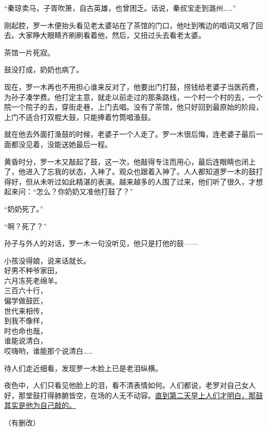 \documentclass[11pt,a4paper]{ctexart}
\begin{document}
\begin{materialtext}
“秦琼卖马，子胥吹箫，自古英雄，也曾困乏。话说，秦叔宝走到潞州……”

刚起腔，罗一木便抬头看见老太婆站在了茶馆的门口，他吐到嘴边的唱词又咽了回去。大家睁大眼睛齐刷刷看着他，然后，又扭过头去看老太婆。

茶馆一片死寂。

鼓没打成，奶奶也病了。

现在，罗一木再也不用担心谁来反对了，他要出门打鼓，捞钱给老婆子当医药费，为孙子凑学费。他打定主意，就走以前走过的那条路线，一个村一个村的去，一个院一个院子的去，穿街走巷，上门去唱。没有了茶馆，他只好回到最原始的阶段，上门不适合打双棍大鼓，只能捧着竹筒唱渔鼓。

就在他去外面打渔鼓的时候，老婆子一个人走了。罗一木很后悔，连老婆子最后一面都没见着，没能送她最后一程。

黄昏时分，罗一木又敲起了鼓，这一次，他敲得专注而用心，最后连眼睛也闭上了，他进入了忘我的状态，入神了。观众也跟着入神了。人人都知道罗一木的鼓打得好，但从未听过如此精湛的表演。越来越多的人围了过来，他们听了很久，才想起来问：“怎么？你奶奶又准他打鼓了？”

“奶奶死了。”

“啊？死了？”

孙子与外人的对话，罗一木一句没听见，他只是打他的鼓——

\begin{center}
小孩没得娘，说来话就长。\\
好男不种爷家田，\\
六月冻死老绵羊。\\
三百六十行，\\
偏学做鼓匠，\\
世代来相传，\\
到我不像样，\\
时也命也哉，\\
谁能说清白，\\
哎嗨哟，谁能那个说清白……
\end{center}

待人们走近细看，发现罗一木脸上已是老泪纵横。

夜色中，人们只看见他脸上的泪，看不清表情如何。人们都说，老罗对自己女人好，那堂鼓打得肺腑皆空，在场的人无不动容。\uline{直到第二天早上人们才明白，那鼓其实是他为自己敲的。}
\end{materialtext}
\begin{flushright}（有删改）\end{flushright}
\end{document}
